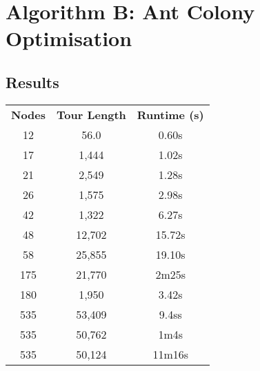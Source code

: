\documentclass[a4paper, 11pt,table]{article}
\begin{document}
	\section{Algorithm B: Ant Colony Optimisation}
	
	\subsection{Results}
	\label{useCase:antResults}
	\begin{center}
		\begin{tabu}{|c c c|}
			\textbf{Nodes} & \textbf{Tour Length} & \textbf{Runtime (s)} \\
			12             & 56.0                 & 0.60s                \\
			17             & 1,444                & 1.02s                \\
			21             & 2,549                & 1.28s                \\
			26             & 1,575                & 2.98s                \\
			42             & 1,322                & 6.27s                \\
			48             & 12,702               & 15.72s               \\
			58             & 25,855               & 19.10s               \\
			175            & 21,770               & 2m25s                \\
			180            & 1,950                & 3.42s                \\
			535            & 53,409               & 9.4ss                \\
			535            & 50,762               & 1m4s                 \\
			535            & 50,124               & 11m16s               \\
		\end{tabu}
	\end{center}
	
\end{document}
